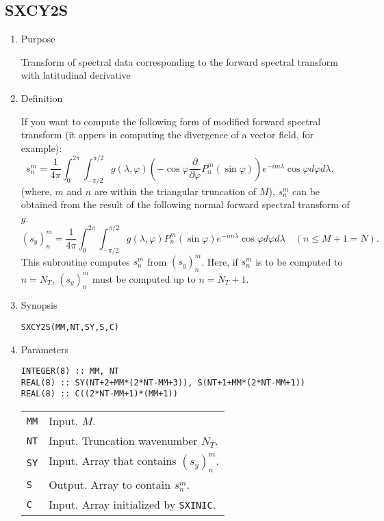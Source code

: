 \documentclass[a4paper]{scrartcl}
\begin{document}

\subsection{SXCY2S}

\begin{enumerate}

\item Purpose 

Transform of spectral data 
corresponding to the forward spectral transform with latitudinal derivative

\item Definition

If you want to compute the following form of modified forward
spectral transform
(it appers in computing the divergence of a vector field, for example):
\begin{equation}
s^m_n=\frac1{4\pi}\int^{2\pi}_0\int^{\pi/2}_{-\pi/2}
g(\lambda,\varphi)
\left(-\cos\varphi\frac{\partial}{\partial\varphi}P^m_n(\sin\varphi)\right)
e^{-im\lambda}\cos\varphi d\varphi
d\lambda,
\quad 
\end{equation}
(where, $m$ and $n$ are within the triangular truncation of $M$),
$s^m_n$ can be obtained from the result of 
the following normal forward spectral
transform of $g$:
\begin{equation}
(s_y)^m_n=\frac1{4\pi}\int^{2\pi}_0\int^{\pi/2}_{-\pi/2}
g(\lambda,\varphi)
P^m_n(\sin\varphi)
e^{-im\lambda}\cos\varphi d\varphi
d\lambda
\quad (n\le M+1=N).
\end{equation}
This subroutine computes $s^m_n$ from $(s_y)^m_n$.
Here, if $s^m_n$ is to be computed to $n=N_T$, $(s_y)^m_n$
must be computed up to  $n=N_T+1$.

\item Synopsis

\texttt{SXCY2S(MM,NT,SY,S,C)}
  
\item Parameters

\begin{verbatim}
INTEGER(8) :: MM, NT
REAL(8) :: SY(NT+2+MM*(2*NT-MM+3)), S(NT+1+MM*(2*NT-MM+1))
REAL(8) :: C((2*NT-MM+1)*(MM+1))
\end{verbatim}


\begin{tabular}{ll}
\texttt{MM} & Input. $M$.\\  
\texttt{NT} & Input. Truncation wavenumber $N_T$.\\
\texttt{SY} & Input. Array that contains $(s_y)^m_n$.\\
\texttt{S} & Output. Array to contain $s^m_n$.\\
\texttt{C} & Input. Array initialized by  \texttt{SXINIC}.
\end{tabular}


\end{enumerate}
\end{document}
